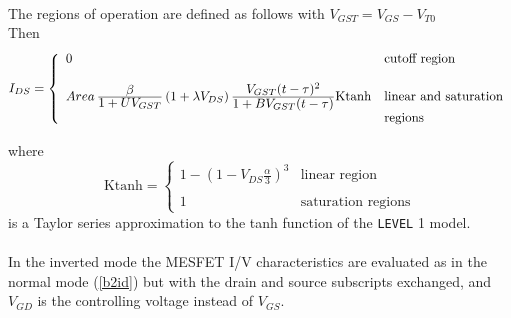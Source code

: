 \\[0.2in]
The regions of operation are defined as follows
with $V_{GST} = V_{GS}-V_{T0}$ \inlineeq
\hspace*{\fill}\\[0.1in]
Then
\begin{equation}
I_{DS} = \left\{ \begin{array}{ll}
      0  & \mbox{cutoff region} \\ \\
      Area\,{{\textstyle\beta}\over{\textstyle 1 + U V_{GST}}}
      \left(1 + \lambda V_{DS}\right)
      {{\textstyle V_{GST}(t-\tau)^2}\over
      {\textstyle 1 + BV_{GST}(t-\tau)}}
      \mbox{Ktanh}
         &\mbox{linear and saturation}\\
         &\mbox{regions} \end{array} \right. %
      \label{b2id}
\end{equation}

where
\begin{equation}
\mbox{Ktanh} = \left\{ \begin{array}{ll}
       1 - \left(1 - V_{DS} \frac{\textstyle\alpha}{\textstyle 3}\right)^3
        & \mbox{linear region} \\ \\
      1
         &\mbox{saturation regions} \end{array} \right. %
\end{equation}
is a Taylor series approximation to the tanh function
of the {\tt LEVEL} 1 model.\\[0.1in]
\\[0.2in]
In the inverted mode the MESFET I/V characteristics are evaluated as in the
normal mode (\ref{b2id}) but with the drain and source subscripts
exchanged, and $V_{GD}$ is the controlling voltage instead of $V_{GS}$.

